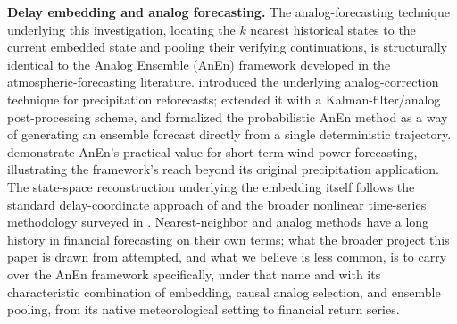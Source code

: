\documentclass[preprint,12pt]{elsarticle}
\begin{document}
\textbf{Delay embedding and analog forecasting.} The analog-forecasting technique underlying
this investigation, locating the $k$ nearest historical states to the current embedded state
and pooling their verifying continuations, is structurally identical to the Analog Ensemble
(AnEn) framework developed in the atmospheric-forecasting literature. \citet{hamill2006}
introduced the underlying analog-correction technique for precipitation reforecasts;
\citet{dellemonache2011} extended it with a Kalman-filter/analog post-processing scheme, and
\citet{dellemonache2013} formalized the probabilistic AnEn method as a way of generating an
ensemble forecast directly from a single deterministic trajectory. \citet{alessandrini2015}
demonstrate AnEn's practical value for short-term wind-power forecasting, illustrating the
framework's reach beyond its original precipitation application. The state-space
reconstruction underlying the embedding itself follows the standard delay-coordinate approach
of \citet{takens1981} and the broader nonlinear time-series methodology surveyed in
\citet{kantz2004}. Nearest-neighbor and analog methods have a long history in financial
forecasting on their own terms; what the broader project this paper is drawn from attempted,
and what we believe is less common, is to carry over the AnEn framework specifically, under
that name and with its characteristic combination of embedding, causal analog selection, and
ensemble pooling, from its native meteorological setting to financial return series.
\end{document}
